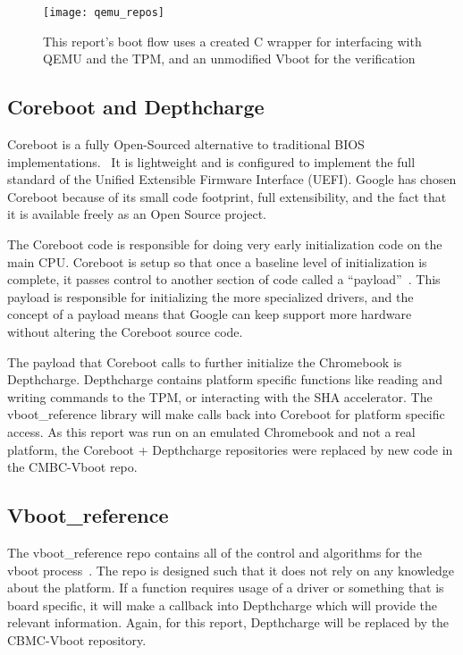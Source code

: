 \begin{figure}
  \centering
  \texttt{[image: qemu\_repos]}
  \caption[This report's Repository Layout]{This report's boot flow uses a
      created C wrapper for interfacing with QEMU and the TPM, and an unmodified Vboot for the verification}\label{fig:qemu_repos}
\end{figure}

\subsection{Coreboot and Depthcharge}\label{coreboot}

Coreboot is a fully Open-Sourced alternative to traditional BIOS implementations.~\cite{coreboot}
It is lightweight and is configured to implement the full standard of the Unified Extensible Firmware Interface (UEFI).
Google has chosen Coreboot because of its small code footprint, full extensibility, and the fact that it is available freely as an Open Source project.

The Coreboot code is responsible for doing very early initialization code on the main CPU\@. 
Coreboot is setup so that once a baseline level of initialization is complete, it passes control to another section of code called a ``payload''~\cite{coreboot-payload}.
This payload is responsible for initializing the more specialized drivers, and the concept of a payload means that Google can keep support more hardware without altering the Coreboot source code.

The payload that Coreboot calls to further initialize the Chromebook is Depthcharge.
Depthcharge contains platform specific functions like reading and writing
commands to the TPM, or interacting with the SHA accelerator. 
The vboot\_reference library will make calls back into Coreboot for platform
specific access. 
As this report was run on an emulated Chromebook and not a real platform, the
Coreboot + Depthcharge repositories were replaced by new code in the CMBC-Vboot
repo.

\subsection{Vboot\_reference}

The vboot\_reference repo contains all of the control and algorithms for the vboot process~\cite{vboot-codebase}.
The repo is designed such that it does not rely on any knowledge about the platform.
If a function requires usage of a driver or something that is board specific, it will make a callback into Depthcharge which will provide the relevant information.
Again, for this report, Depthcharge will be replaced by the CBMC-Vboot
repository.

